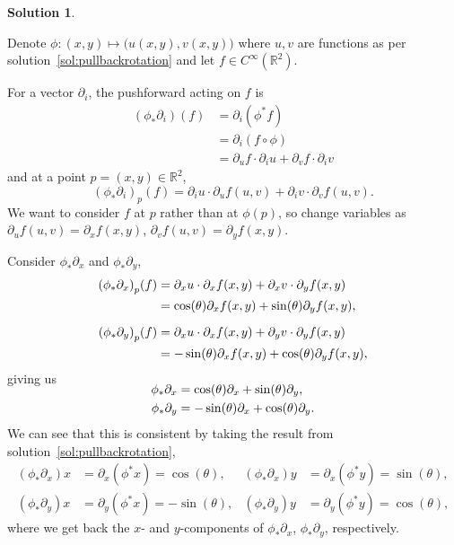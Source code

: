 \documentclass[11pt, a4paper]{report}
\theoremstyle{definition}
\newtheorem{sol}{Solution}[part]
\begin{document}
\begin{sol}\label{sol:pushforwardrotation}

Denote $\phi: (x, y) \mapsto \bigl( u(x, y), v(x, y) \bigr)$ where $u, v$ are functions as per solution~\ref{sol:pullbackrotation} and let $f \in C^\infty(\mathbb{R}^2)$.

For a vector $\partial_i$, the pushforward acting on $f$ is
\begin{align*}
    (\phi_* \partial_i)(f) &= \partial_i (\phi^* f) \\
        &= \partial_i (f \circ \phi) \\
        &= \partial_u f \cdot \partial_i u + \partial_v f \cdot \partial_i v
\end{align*}
and at a point $p = (x, y) \in \mathbb{R}^2$,
\[
     {(\phi_* \partial_i)}_p(f) = \partial_i u \cdot \partial_u f(u, v) + \partial_i v \cdot \partial_v f(u, v).
\]
We want to consider $f$ at $p$ rather than at $\phi(p)$, so change variables as $\partial_u f(u, v) = \partial_x f(x, y)$, $\partial_v f(u, v) = \partial_y f(x, y)$.

Consider $\phi_* \partial_x$ and $\phi_* \partial_y$,
\begin{align*}
    {(\phi_* \partial_x)}_p(f) &= \partial_x u \cdot \partial_x f(x, y) + \partial_x v \cdot \partial_y f(x, y) \\
        &= \cos(\theta) \partial_x f(x, y) + \sin(\theta) \partial_y f(x, y), \\[2\jot]
    {(\phi_* \partial_y)}_p(f) &= \partial_x u \cdot \partial_x f(x, y) + \partial_y v \cdot \partial_y f(x, y) \\
        &= -\sin(\theta) \partial_x f(x, y) + \cos(\theta) \partial_y f(x, y),
\end{align*}
giving us
\begin{align*}
    \SwapAboveDisplaySkip
    \phi_* \partial_x &= \cos(\theta) \partial_x + \sin(\theta) \partial_y, \\
    \phi_* \partial_y &= -\sin(\theta) \partial_x + \cos(\theta) \partial_y.
\end{align*}
We can see that this is consistent by taking the result from solution~\ref{sol:pullbackrotation},
\begin{align*}
    (\phi_* \partial_x) x &= \partial_x(\phi^* x) = \cos(\theta), &
    (\phi_* \partial_x) y &= \partial_x(\phi^* y) = \sin(\theta), \\
    (\phi_* \partial_y) x &= \partial_y(\phi^* x) = -\sin(\theta), &
    (\phi_* \partial_y) y &= \partial_y(\phi^* y) = \cos(\theta),
\end{align*}
where we get back the $x$- and $y$-components of $\phi_* \partial_x$, $\phi_* \partial_y$, respectively.

\end{sol}
\end{document}
